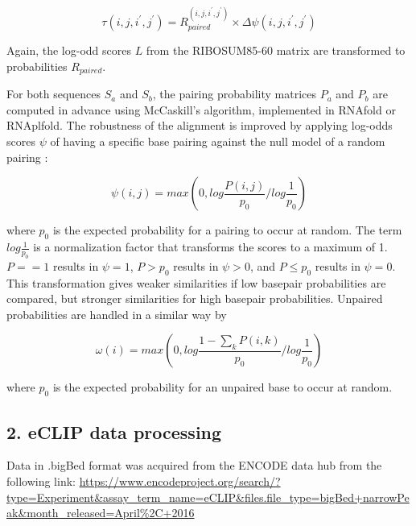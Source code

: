 \documentclass[a4paper,11pt]{article}
\begin{document}
\begin{equation}\label{eq10}
	\tau(i,j,i^\prime,j^\prime) = R_{paired}^{(i,j,i^\prime,j^\prime)}
\times \Delta \psi(i,j,i^\prime,j^\prime)
\end{equation}

\noindent Again, the log-odd scores $L$ from the RIBOSUM85-60 matrix \cite{Klein14499004}
are transformed to probabilities $R_{paired}$.

\noindent For both sequences $S_a$ and $S_b$, the pairing probability matrices $P_a$ and
$P_b$ are computed in advance using McCaskill's algorithm, implemented in
RNAfold or RNAplfold. The robustness of the alignment is improved by applying
log-odds scores $\psi$ of having a specific base pairing against the null model
of a random pairing \cite{Will17432929}:

\begin{equation}\label{eq11}
	\psi(i,j) = max \left( 0, log \frac{P(i,j)}{p_0} / log \frac{1}{p_0} \right)
\end{equation}

\noindent where $p_0$ is the expected probability for a pairing to occur at random. The
term $log \frac{1}{p_0}$ is a normalization factor that transforms the scores to
a maximum of 1. $P==1$ results in $\psi=1$, $P>p_0$ results in $\psi>0$, and $P\le
p_0$ results in $\psi=0$.  This transformation gives weaker similarities if low
basepair probabilities are compared, but stronger similarities for high basepair
probabilities. Unpaired probabilities are handled in a similar way by

\begin{equation}\label{eq12}
	\omega(i) = max \left( 0, log \frac{1 - \sum_k P(i,k)}{p_0} / log \frac{1}{p_0} \right)
\end{equation}

\noindent  where $p_0$ is the expected probability for an unpaired base to occur at
random.

\subsection*{ 2.  eCLIP data processing }
Data in .bigBed format was acquired from the ENCODE data hub from the following link:
\url{https://www.encodeproject.org/search/?type=Experiment&assay_term_name=eCLIP&files.file_type=bigBed+narrowPeak&month_released=April\%2C+2016}
\end{document}
